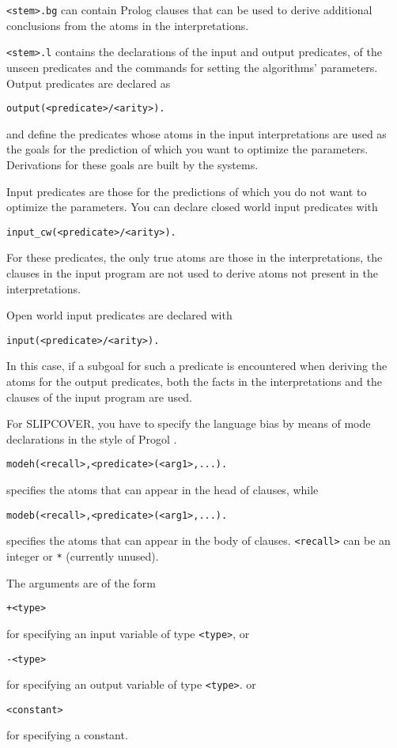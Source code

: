 \documentclass[a4paper,10pt]{article}
\newcommand{\href}[2]{\Link[#1]{}{} #2 \EndLink}
\begin{document}
\texttt{<stem>.bg} can contain Prolog clauses that can be used to derive additional conclusions from the atoms in 
the interpretations.

\texttt{<stem>.l} contains the declarations of the input and output predicates, of the unseen predicates and the commands for setting the algorithms' parameters.
Output predicates are declared as
\begin{verbatim}
output(<predicate>/<arity>).
\end{verbatim}
and define the predicates whose atoms in the input interpretations are used as the goals for the prediction of which you want to optimize the parameters. Derivations for these goals are built by the systems.

Input predicates are those for the predictions of which you do not want to optimize the parameters. You can declare closed world input predicates with
\begin{verbatim}
input_cw(<predicate>/<arity>).
\end{verbatim}
For these predicates, the only true atoms are those in the interpretations, the clauses in the input program are not used to derive atoms not present in the interpretations.

Open world input predicates are declared with
\begin{verbatim}
input(<predicate>/<arity>).
\end{verbatim}
In this case, if a subgoal for such a predicate is encountered when deriving the atoms for the output predicates, 
both the facts in the interpretations and the clauses of the input program are used.


For SLIPCOVER, you have to specify the language bias by means of mode declarations in the style of 
\href{http://www.doc.ic.ac.uk/\string ~shm/progol.html}{Progol}.
\begin{verbatim}
modeh(<recall>,<predicate>(<arg1>,...).
\end{verbatim}
specifies the atoms that can appear in the head of clauses, while
\begin{verbatim}
modeb(<recall>,<predicate>(<arg1>,...).
\end{verbatim}
specifies the atoms that can appear in the body of clauses.
\texttt{<recall>} can be an integer or \texttt{*} (currently unused).

The arguments are of the form
\begin{verbatim}
+<type>
\end{verbatim}
for specifying an input variable of type \texttt{<type>}, or 
\begin{verbatim}
-<type>
\end{verbatim}
for specifying an output variable of type \texttt{<type>}. or
\begin{verbatim}
<constant>
\end{verbatim}
for specifying a constant.
\end{document}
